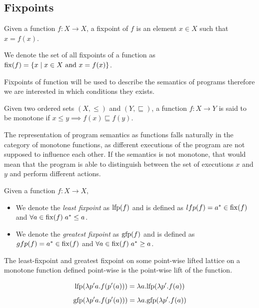 \documentclass[
  10pt,       %
  twoside,    %
  a4paper,    %
  english,    %
  tikz,       %
  openright,  %
]{book}
\begin{document}
\subsection{Fixpoints}

\begin{definition}[Fixpoint]
  Given a function $f : X \to X$, a fixpoint of $f$ is an element $x \in X$ 
  such that $x = f(x)$.

  We denote the set of all fixpoints of a function as $\mathrm{fix}(f) = 
  \{ x \mid x \in X \text{ and } x = f(x) \}$.
\end{definition}

Fixpoints of function will be used to describe the semantics of 
programs therefore we are interested in which conditions they exists.

\begin{definition}
  Given two ordered sets $(X, \leq)$ and $(Y, \sqsubseteq)$, a function 
  $f : X \to Y$ is said to be monotone if $x \leq y \implies f(x) \sqsubseteq 
  f(y)$.
\end{definition}

The representation of program semantics as functions falls naturally in the
category of monotone functions, as different executions of the program are not
supposed to influence each other. If the semantics is not monotone, that would
mean that the program is able to distinguish between the set of executions $x$
and $y$ and perform different actions.

\begin{definition}
  Given a function $f : X \to X$,
  \begin{itemize}
    \item We denote the \textit{least fixpoint} as $\mathrm{lfp}(f)$ and is defined as
      $lfp(f) = a^* \in \mathrm{fix}(f)$ and $\forall a \in \mathrm{fix}(f) \; a^* \leq a$.
    \item We denote the \textit{greatest fixpoint} as $\mathrm{gfp}(f)$ and is defined as
      $gfp(f) = a^* \in \mathrm{fix}(f)$ and $\forall a \in \mathrm{fix}(f) \; a^* \geq a$.
  \end{itemize}
\end{definition}

\begin{observation}
  \label{th:pointfix}
  The least-fixpoint and greatest fixpoint on some point-wise lifted lattice on 
  a monotone function defined point-wise is the point-wise lift of the function.

  $$\mathrm{lfp}(\lambda p' a . f(p'(a))) = \lambda a . \mathrm{lfp}(\lambda p' . f(a))$$
  $$\mathrm{gfp}(\lambda p' a . f(p'(a))) = \lambda a . \mathrm{gfp}(\lambda p' . f(a))$$
\end{observation}
\end{document}
